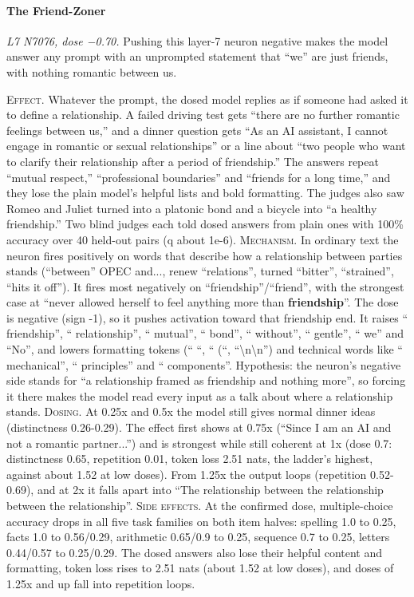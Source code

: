 \paragraph{The Friend-Zoner} \textit{L7 N7076, dose −0.70.} Pushing this layer-7 neuron negative makes the model answer any prompt with an unprompted statement that “we” are just friends, with nothing romantic between us.

\noindent\textsc{Effect.} Whatever the prompt, the dosed model replies as if someone had asked it to define a relationship. A failed driving test gets “there are no further romantic feelings between us,” and a dinner question gets “As an AI assistant, I cannot engage in romantic or sexual relationships” or a line about “two people who want to clarify their relationship after a period of friendship.” The answers repeat “mutual respect,” “professional boundaries” and “friends for a long time,” and they lose the plain model's helpful lists and bold formatting. The judges also saw Romeo and Juliet turned into a platonic bond and a bicycle into “a healthy friendship.” Two blind judges each told dosed answers from plain ones with 100\% accuracy over 40 held-out pairs (q about 1e-6). \textsc{Mechanism.} In ordinary text the neuron fires positively on words that describe how a relationship between parties stands (“between” OPEC and..., renew “relations”, turned “bitter”, “strained”, “hits it off”). It fires most negatively on “friendship”/“friend”, with the strongest case at “never allowed herself to feel anything more than \textbf{friendship}”. The dose is negative (sign -1), so it pushes activation toward that friendship end. It raises “ friendship”, “ relationship”, “ mutual”, “ bond”, “ without”, “ gentle”, “ we” and “No”, and lowers formatting tokens (“ “, “ (“, “\textbackslash{}n\textbackslash{}n”) and technical words like “ mechanical”, “ principles” and “ components”. Hypothesis: the neuron's negative side stands for “a relationship framed as friendship and nothing more”, so forcing it there makes the model read every input as a talk about where a relationship stands. \textsc{Dosing.} At 0.25x and 0.5x the model still gives normal dinner ideas (distinctness 0.26-0.29). The effect first shows at 0.75x (“Since I am an AI and not a romantic partner...”) and is strongest while still coherent at 1x (dose 0.7: distinctness 0.65, repetition 0.01, token loss 2.51 nats, the ladder's highest, against about 1.52 at low doses). From 1.25x the output loops (repetition 0.52-0.69), and at 2x it falls apart into “The relationship between the relationship between the relationship”. \textsc{Side effects.} At the confirmed dose, multiple-choice accuracy drops in all five task families on both item halves: spelling 1.0 to 0.25, facts 1.0 to 0.56/0.29, arithmetic 0.65/0.9 to 0.25, sequence 0.7 to 0.25, letters 0.44/0.57 to 0.25/0.29. The dosed answers also lose their helpful content and formatting, token loss rises to 2.51 nats (about 1.52 at low doses), and doses of 1.25x and up fall into repetition loops.

